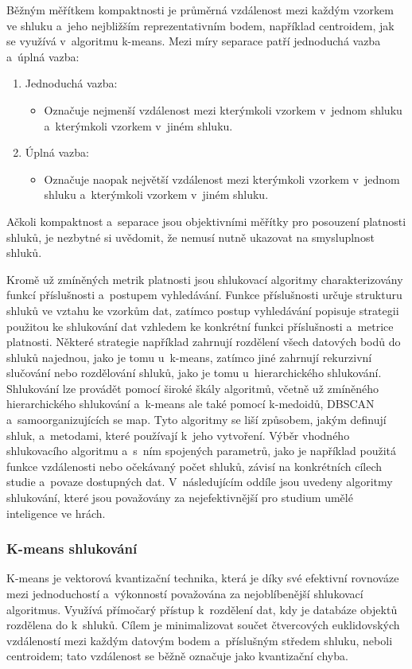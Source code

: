 Běžným měřítkem kompaktnosti je průměrná vzdálenost mezi každým vzorkem ve shluku a~jeho nejbližším reprezentativním bodem, například centroidem, jak se využívá v~algoritmu k-means. Mezi míry separace patří jednoduchá vazba a~úplná vazba:
\begin{enumerate}
	\item Jednoduchá vazba:
	\begin{itemize}
		\item Označuje nejmenší vzdálenost mezi kterýmkoli vzorkem v~jednom shluku a~kterýmkoli vzorkem v~jiném shluku. 
	\end{itemize} 
	\item Úplná vazba:
	\begin{itemize}
		\item Označuje naopak největší vzdálenost mezi kterýmkoli vzorkem v~jednom shluku a~kterýmkoli vzorkem v~jiném shluku.
	\end{itemize} 
\end{enumerate}

Ačkoli kompaktnost a~separace jsou objektivními měřítky pro posouzení platnosti shluků, je nezbytné si uvědomit, že nemusí nutně ukazovat na smysluplnost shluků.

\newpage

Kromě už zmíněných metrik platnosti jsou shlukovací algoritmy charakterizovány funkcí příslušnosti a~postupem vyhledávání. Funkce příslušnosti určuje strukturu shluků ve vztahu ke vzorkům dat, zatímco postup vyhledávání popisuje strategii použitou ke shlukování dat vzhledem ke konkrétní funkci příslušnosti a~metrice platnosti. Některé strategie například zahrnují rozdělení všech datových bodů do shluků najednou, jako je tomu u~k-means, zatímco jiné zahrnují rekurzivní slučování nebo rozdělování shluků, jako je tomu u~hierarchického shlukování. Shlukování lze provádět pomocí široké škály algoritmů, včetně už zmíněného hierarchického shlukování a~k-means ale také pomocí k-medoidů, DBSCAN a~samoorganizujících se map. Tyto algoritmy se liší způsobem, jakým definují shluk, a~metodami, které používají k~jeho vytvoření. Výběr vhodného shlukovacího algoritmu a~s~ním spojených parametrů, jako je například použitá funkce vzdálenosti nebo očekávaný počet shluků, závisí na konkrétních cílech studie a~povaze dostupných dat. V~následujícím oddíle jsou uvedeny algoritmy shlukování, které jsou považovány za nejefektivnější pro studium umělé inteligence ve hrách.

\subsubsection{K-means shlukování}
K-means\cite{Macqueen1967} je vektorová kvantizační technika, která je díky své efektivní rovnováze mezi jednoduchostí a~výkonností považována za nejoblíbenější shlukovací algoritmus. Využívá přímočarý přístup k~rozdělení dat, kdy je databáze objektů rozdělena do k~shluků. Cílem je minimalizovat součet čtvercových euklidovských vzdáleností mezi každým datovým bodem a~příslušným středem shluku, neboli centroidem; tato vzdálenost se běžně označuje jako kvantizační chyba.

